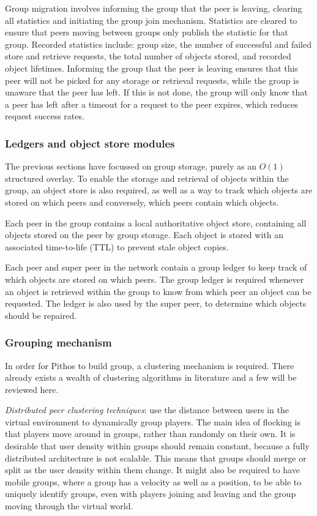 Group migration involves informing the group that the peer is leaving, clearing all statistics and initiating the group join mechanism. Statistics are cleared to ensure that peers moving between groups only publish the statistic for that group. Recorded statistics include: group size, the number of successful and failed store and retrieve requests, the total number of objects stored, and recorded object lifetimes. Informing the group that the peer is leaving ensures that this peer will not be picked for any storage or retrieval requests, while the group is unaware that the peer has left. If this is not done, the group will only know that a peer has left after a timeout for a request to the peer expires, which reduces request success rates.

\subsubsection{Ledgers and object store modules}

The previous sections have focussed on group storage, purely as an $O(1)$ structured overlay. To enable the storage and retrieval of objects within the group, an object store is also required, as well as a way to track which objects are stored on which peers and conversely, which peers contain which objects.

Each peer in the group contains a local authoritative object store, containing all objects stored on the peer by group storage. Each object is stored with an associated time-to-life (TTL) to prevent stale object copies.

Each peer and super peer in the network contain a group ledger to keep track of which objects are stored on which peers. The group ledger is required whenever an object is retrieved within the group to know from which peer an object can be requested. The ledger is also used by the super peer, to determine which objects should be repaired.

\subsubsection{Grouping mechanism}
\label{grouping_design}

In order for Pithos to build group, a clustering mechanism is required. There already exists a wealth of clustering algorithms in literature and a few will be reviewed here.

\emph{Distributed peer clustering techniques}: use the distance between users in the virtual environment to dynamically group players. The main idea of flocking is that players move around in groups, rather than randomly on their own. It is desirable that user density within groups should remain constant, because a fully distributed architecture is not scalable. This means that groups should merge or split as the user density within them change. It might also be required to have mobile groups, where a group has a velocity as well as a position, to be able to uniquely identify groups, even with players joining and leaving and the group moving through the virtual world.

